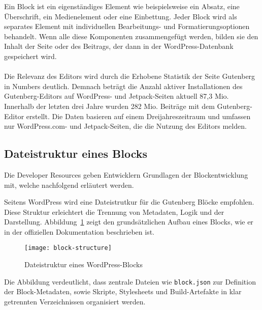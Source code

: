 Ein Block ist ein eigenständiges Element wie beispielsweise ein Absatz, eine Überschrift, ein Medienelement oder eine Einbettung.
Jeder Block wird als separates Element mit individuellen Bearbeitungs- und Formatierungsoptionen behandelt.
Wenn alle diese Komponenten zusammengefügt werden, bilden sie den Inhalt der Seite oder des Beitrags, der dann in der WordPress-Datenbank gespeichert wird.
\\
\\
Die Relevanz des Editors wird durch die Erhobene Statistik der Seite Gutenberg in Numbers deutlich.
Demnach beträgt die Anzahl aktiver Installationen des Gutenberg-Editors auf WordPress- und Jetpack-Seiten aktuell 87,3 Mio.
Innerhalb der letzten drei Jahre wurden 282 Mio. Beiträge mit dem Gutenberg-Editor erstellt.
Die Daten basieren auf einem Dreijahreszeitraum und umfassen nur WordPress.com- und Jetpack-Seiten, die die Nutzung des Editors melden. \cite{gutenstats}

\subsection{Dateistruktur eines Blocks}
Die Developer Resources geben Entwicklern Grundlagen der Blockentwicklung mit, welche nachfolgend erläutert werden.

Seitens WordPress wird eine Dateistrutkur für die Gutenberg Blöcke empfohlen.
Diese Struktur erleichtert die Trennung von Metadaten, Logik und der Darstellung.
Abbildung~\ref{fig:block-structure} zeigt den grundsätzlichen Aufbau eines Blocks, wie er in der offiziellen Dokumentation beschrieben ist.

\begin{figure}[h!]
    \centering
    \texttt{[image: block-structure]} %
    \caption{Dateistruktur eines WordPress-Blocks \cite{wordpress2023}}
    \label{fig:block-structure}
\end{figure}
Die Abbildung verdeutlicht, dass zentrale Dateien wie \texttt{block.json} zur Definition der Block-Metadaten,
sowie Skripte, Stylesheets und Build-Artefakte in klar getrennten Verzeichnissen organisiert werden.



